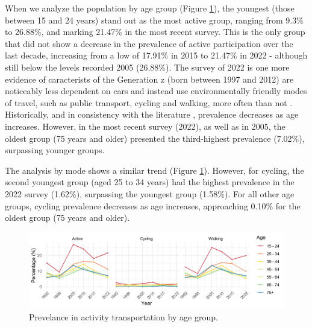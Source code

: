 \documentclass[preprint, 3p,
authoryear]{elsarticle} %
\begin{document}
When we analyze the population by age group (Figure
\ref{fig:age-perc-figure}), the youngest (those between 15 and 24 years)
stand out as the most active group, ranging from 9.3\% to 26.88\%, and
marking 21.47\% in the most recent survey. This is the only group that
did not show a decrease in the prevalence of active participation over
the last decade, increasing from a low of 17.91\% in 2015 to 21.47\% in
2022 - although still below the levels recorded 2005 (26.88\%). The
survey of 2022 is one more evidence of caracterists of the Generation z
(born between 1997 and 2012) \citep{dimock2019} are noticeably less
dependent on cars and instead use environmentally friendly modes of
travel, such as public transport, cycling and walking, more often than
not \citep{haseeb2024, grimsrud2014, kuhnimhof2011}. Historically, and
in consistency with the literature \citep{bryan2009, borhani2024},
prevalence decreases as age increases. However, in the most recent
survey (2022), as well as in 2005, the oldest group (75 years and older)
presented the third-highest prevalence (7.02\%), surpassing younger
groups.

The analysis by mode shows a similar trend (Figure
\ref{fig:age-perc-figure}). However, for cycling, the second youngest
group (aged 25 to 34 years) had the highest prevalence in the 2022
survey (1.62\%), surpassing the youngest group (1.58\%). For all other
age groups, cycling prevalence decreases as age increases, approaching
0.10\% for the oldest group (75 years and older).

\begin{figure}
\includegraphics[width=1\linewidth]{figures/active_pop_age_graph} \caption{Prevelance in activity transportation by age group.}\label{fig:age-perc-figure}
\end{figure}
\end{document}
